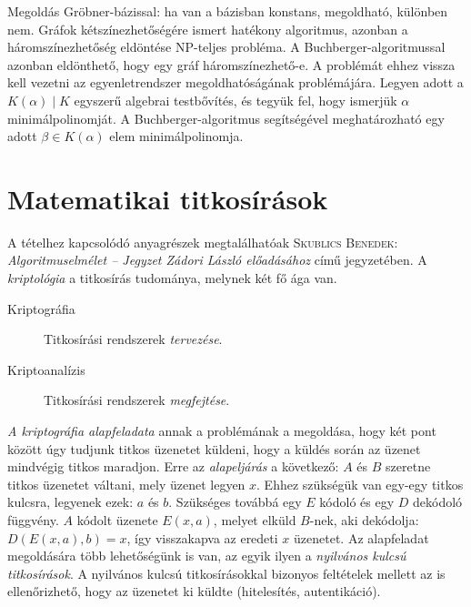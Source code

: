 \documentclass[DIV=15,appendixprefix]{scrreprt}
\theoremstyle{definition}
\theoremstyle{remark}
\begin{document}
Megoldás Gröbner-bázissal: ha van a bázisban konstans, megoldható, különben nem.
%
Gráfok kétszínezhetőségére ismert hatékony algoritmus, azonban a háromszínezhetőség eldöntése
NP-teljes probléma. A Buchberger-algoritmussal azonban eldönthető, hogy egy gráf háromszínezhető-e.
A problémát ehhez vissza kell vezetni az egyenletrendszer megoldhatóságának problémájára.
%
Legyen adott a $ K \left( \alpha \right) \mid K $ egyszerű algebrai testbővítés, és tegyük fel, hogy
ismerjük $ \alpha $ minimálpolinomját. A Buchberger-algoritmus segítségével meghatározható egy adott
$\beta \in K \left( \alpha \right) $ elem minimálpolinomja.
%
\section{Matematikai titkosírások}
A tételhez kapcsolódó anyagrészek megtalálhatóak \textsc{Skublics Benedek}: \emph{Algoritmuselmélet -- Jegyzet Zádori László előadásához} \cite{Zadori} című jegyzetében.
%
A \emph{kriptológia} a titkosírás tudománya, melynek két fő ága van.
\begin{description}
	\item[Kriptográfia] Titkosírási rendszerek \emph{tervezése}.
	\item[Kriptoanalízis] Titkosírási rendszerek \emph{megfejtése}.
\end{description}
\emph{A kriptográfia alapfeladata} annak a problémának a megoldása, hogy két pont között úgy tudjunk
titkos üzenetet küldeni, hogy a küldés során az üzenet mindvégig titkos maradjon. Erre az
\emph{alapeljárás} a következő: $ A $ és $ B $ szeretne titkos üzenetet váltani, mely üzenet legyen
$ x $. Ehhez szükségük van egy-egy titkos kulcsra, legyenek ezek: $ a $ és $ b $. Szükséges továbbá
egy $ E $ kódoló és egy $ D $ dekódoló függvény. $ A $ kódolt üzenete $ E \left( x,{} a \right) $,
melyet elküld $ B $-nek, aki dekódolja: $ D \left(  E \left( x,{} a \right),{} b \right) = x $, így
visszakapva az eredeti $ x $ üzenetet.
%
Az alapfeladat megoldására több lehetőségünk is van, az egyik ilyen a \emph{nyilvános kulcsú
titkosírások}. A nyilvános kulcsú titkosírásokkal bizonyos feltételek mellett az is ellenőrizhető,
hogy az üzenetet ki küldte (hitelesítés, autentikáció).
\end{document}
